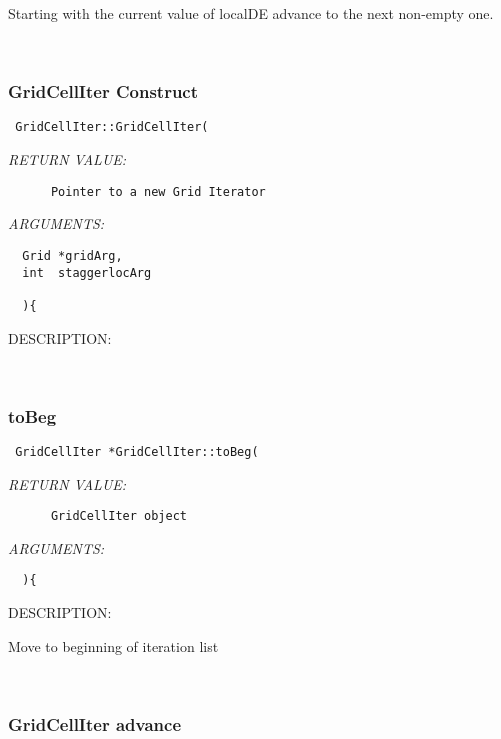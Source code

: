    Starting with the current value of localDE advance to the next non-empty one. 
   
 
\mbox{}\hrulefill\
 
\subsubsection [GridCellIter] {GridCellIter Construct}


  
\begin{verbatim} GridCellIter::GridCellIter(\end{verbatim}{\em RETURN VALUE:}
\begin{verbatim}      Pointer to a new Grid Iterator\end{verbatim}{\em ARGUMENTS:}
\begin{verbatim}    
  Grid *gridArg,
  int  staggerlocArg
 
  ){\end{verbatim}
{\sf DESCRIPTION:\\ }


 
   
 
\mbox{}\hrulefill\
 
\subsubsection [toBeg] {toBeg}


  
\begin{verbatim} GridCellIter *GridCellIter::toBeg(\end{verbatim}{\em RETURN VALUE:}
\begin{verbatim}      GridCellIter object\end{verbatim}{\em ARGUMENTS:}
\begin{verbatim}    
  ){\end{verbatim}
{\sf DESCRIPTION:\\ }


   Move to beginning of iteration list
   
 
\mbox{}\hrulefill\
 
\subsubsection [GridCellIter] {GridCellIter advance}


